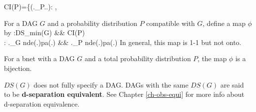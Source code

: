 \beq
CI(P)=\{(\rvA.\perp_P\rvB.\cond \rvZ.):
\;,
\eeq


For a DAG $G$
and a probability
distribution $P$
compatible with $G$,
define  a map $\phi$
by
\beqa
\phi:DS_{min}(G) &\rarrow& CI(P)
\\
\phi: \rvA.\perp_G nde(\rvA.)\cond pa(\rvA.)
&\mapsto&
\rvA.\perp_P nde(\rvA.)\cond pa(\rvA.)
\eeqa
In general, this map
is 1-1 but not onto.


\begin{claim}
For a bnet 
with a DAG $G$
and a total probability distribution $P$,
the map $\phi$ is a bijection.
\end{claim}

$DS(G)$
does not fully specify a DAG.
DAGs with the same 
$DS(G)$ are said to be
{\bf d-separation equivalent}.
See Chapter \ref{ch-obs-equi}
for more info about 
d-separation equivalence.